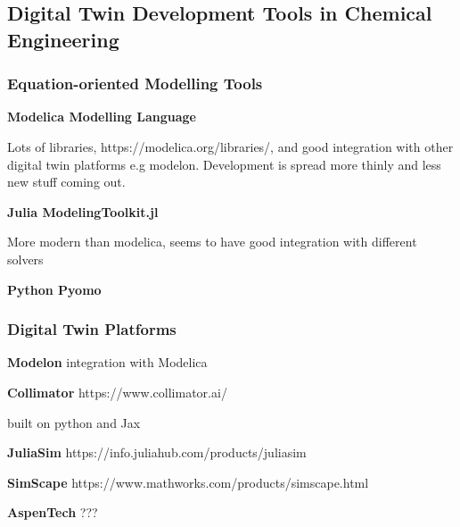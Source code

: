 \subsection{Digital Twin Development Tools in Chemical Engineering}


\subsubsection{Equation-oriented Modelling Tools}








\textbf{Modelica Modelling Language}

Lots of libraries, https://modelica.org/libraries/, and good integration with other digital twin platforms e.g modelon. Development is spread more thinly and less new stuff coming out.


\textbf{Julia ModelingToolkit.jl}

More modern than modelica, seems to have good integration with different solvers


\textbf{Python Pyomo}



\subsubsection{Digital Twin Platforms}




\textbf{Modelon}
integration with Modelica 

\textbf{Collimator}
https://www.collimator.ai/


built on python and Jax

\textbf{JuliaSim}
https://info.juliahub.com/products/juliasim


\textbf{SimScape}
https://www.mathworks.com/products/simscape.html

\textbf{AspenTech} ???

